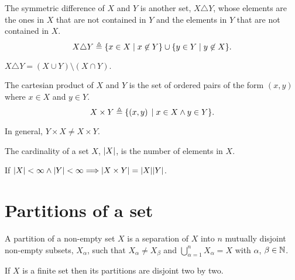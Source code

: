\begin{defn}
    The symmetric difference of $X$ and $Y$ is another set, $X\triangle Y$, whose elements are the ones in $X$ that are not
    contained in $Y$ and the elements in $Y$ that are not contained in $X$.
    \begin{equation}
        X\triangle Y\triangleq\{ x\in X\; | \; x\not\in Y \}\cup\{ y\in Y\; | \; y\not\in X \}.
    \end{equation}
\end{defn}

\begin{remark}
    $X\triangle Y = \left(X\cup Y\right)\setminus\left(X\cap Y\right)$.
\end{remark}

\begin{defn}
    The cartesian product of $X$ and $Y$ is the set of ordered pairs of the form $\left(x, y\right)$ where $x\in X$ and 
    $y\in Y$.
    \begin{equation}
        X\times Y\triangleq\{ \left(x, y\right)\; | \; x\in X\wedge y\in Y \}.
    \end{equation}
\end{defn}

\begin{remark}
    In general, $Y\times X\neq X\times Y$.
\end{remark}

\begin{defn}[Cardinality]
    The cardinality of a set $X$, $\abs{X}$, is the number of elements in $X$.
\end{defn}

\begin{remark}
    If $\abs{X} < \infty\wedge \abs{Y} < \infty\Longrightarrow\abs{X\times Y} = \abs{X}\abs{Y}$.
\end{remark}

\section{Partitions of a set}

\begin{defn}[Partition]
    A partition of a non-empty set $X$ is a separation of $X$ into $n$ mutually disjoint non-empty subsets, $X_\alpha$, such
    that $X_\alpha\neq X_\beta$ and $\displaystyle\bigcup_{\alpha = 1}^n X_\alpha = X$ with $\alpha$, $\beta\in\N$.
\end{defn}

\begin{remark}
    If $X$ is a finite set then its partitions are disjoint two by two.
\end{remark}

